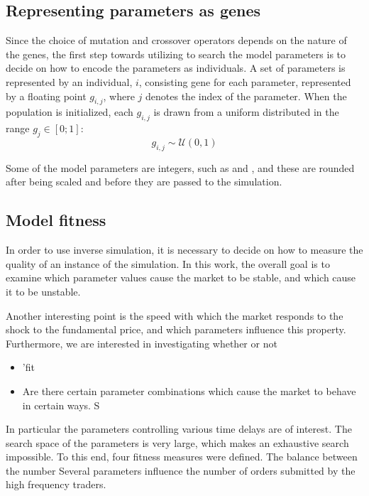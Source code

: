 \subsection{Representing parameters as genes}
Since the choice of mutation and crossover operators depends on the nature of the genes, the first step towards utilizing to search the model parameters is to decide on how to encode the parameters as individuals. 
A set of parameters is represented by an individual, $i$, consisting gene for each parameter, represented by a floating point $g_{i,j}$, where $j$ denotes the index of the parameter. When the population is initialized, each $g_{i,j}$ is drawn from a uniform distributed in the range $g_j \in [0;1]$:
\begin{equation}
g_{i,j} \sim \mathcal{U}(0,1)
\end{equation}


Some of the model parameters are integers, such as \nmm and \nsc, and these are rounded after being scaled and before they are passed to the simulation.





\subsection{Model fitness}\label{section:simulation_fitness}

In order to use inverse simulation, it is necessary to decide on how to measure the quality of an instance of the simulation. In this work, the overall goal is to examine which parameter values cause the market to be stable, and which cause it to be unstable. 


Another interesting point is the speed with which the market responds to the shock to the fundamental price, and which parameters influence this property. Furthermore, we are interested in investigating whether or not 

\begin{itemize}
\item 'fit
\item Are there certain parameter combinations which cause the market to behave in certain ways. S
\end{itemize}
In particular the parameters controlling various time delays are of interest. 
The search space of the parameters is very large, which makes an exhaustive search impossible.
To this end, four fitness measures were defined.
The balance between the number 
Several parameters influence the number of orders submitted by the high frequency traders.

